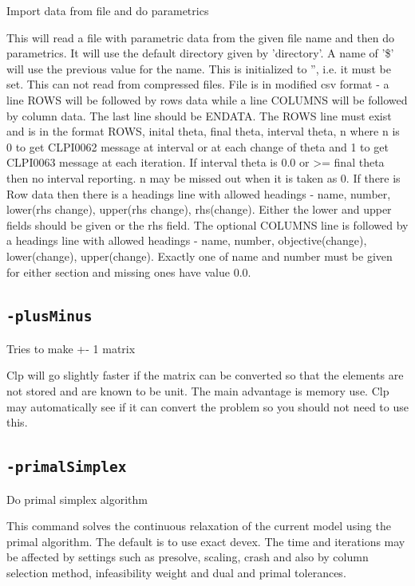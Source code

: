 \documentclass[11pt,a4paper]{article}
\begin{document}
Import data from file and do parametrics

This will read a file with parametric data from the given file name and then do parametrics. It will use the default directory given by 'directory'. A name of '\$' will use the previous value for the name. This is initialized to '', i.e. it must be set.  This can not read from compressed files. File is in modified csv format - a line ROWS will be followed by rows data while a line COLUMNS will be followed by column data.  The last line should be ENDATA. The ROWS line must exist and is in the format ROWS, inital theta, final theta, interval theta, n where n is 0 to get CLPI0062 message at interval or at each change of theta and 1 to get CLPI0063 message at each iteration.  If interval theta is 0.0 or >= final theta then no interval reporting.  n may be missed out when it is taken as 0.  If there is Row data then there is a headings line with allowed headings - name, number, lower(rhs change), upper(rhs change), rhs(change).  Either the lower and upper fields should be given or the rhs field. The optional COLUMNS line is followed by a headings line with allowed headings - name, number, objective(change), lower(change), upper(change). Exactly one of name and number must be given for either section and missing ones have value 0.0.

\subsection*{\texttt{-plusMinus}}

Tries to make +- 1 matrix

Clp will go slightly faster if the matrix can be converted so that the elements are not stored and are known to be unit.  The main advantage is memory use.  Clp may automatically see if it can convert the problem so you should not need to use this.

\subsection*{\texttt{-primalSimplex}}

Do primal simplex algorithm

This command solves the continuous relaxation of the current model using the primal algorithm. The default is to use exact devex. The time and iterations may be affected by settings such as presolve, scaling, crash and also by column selection  method, infeasibility weight and dual and primal tolerances.
\end{document}
